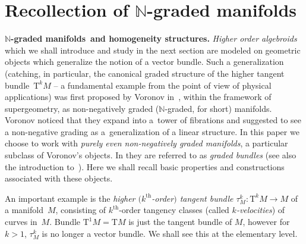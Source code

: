 \documentclass[pdftex]{sigma}
\newcommand{\grBs}{{$\N$-graded manifolds}}
\newcommand{\thh}[1]{#1^{\mathrm{th}}} %
\newcommand{\N}{\mathbb{N}}
\newcommand{\ra}{\rightarrow}
\newcommand{\T}{\mathrm{T}} %
\newcommand{\TT}[1]{\mathrm{T}^{#1}} %
\numberwithin{equation}{section}
\theoremstyle{definition}
\begin{document}
\section{Recollection of $\N$-graded manifolds}\label{sec:gr_bund}

{\bf \grBs\ and homogeneity structures.} \emph{Higher order algebroids} which we shall introduce and study in the next section are modeled on geometric objects which generalize the notion of a vector bundle. Such a generalization (catching, in particular, the canonical graded structure of the higher tangent bundle~$\TT{k} M$ -- a fundamental example from the point of view of physical applications) was first proposed by Voronov in~\cite{Voronov_2002}, within the framework of supergeometry, as non-negatively graded ($\N$-graded, for short) manifolds. Voronov noticed that they expand into a~tower of fibrations and suggested to see a non-negative grading as a~generalization of a linear structure. In this paper we choose to work with \emph{purely even non-negatively graded manifolds}, a particular subclass of Voronov's objects. In \cite{JG_MR_gr_bund_hgm_str_2011} they are referred to as \emph{graded bundles} (see also the introduction to~\cite{BGR}). Here we shall recall basic properties and constructions associated with these objects.

An important example is the \emph{higher $(\thh{k}$-order$)$ tangent bundle $\tau^k_M\colon \TT{k} M\ra M$} of a mani\-fold~$M$, consisting of $\thh{k}$-order tangency classes (called \emph {$k$-velocities}) of curves in~$M$. Bundle $\TT{1} M=\T M$ is just the tangent bundle of $M$, however for $k>1$, $\tau^k_M$ is no longer a vector bundle. We shall see this at the elementary level.
\end{document}
